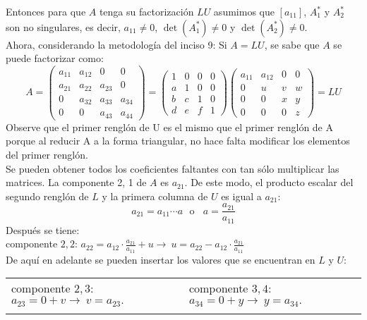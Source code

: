 \documentclass[11pt,letterpaper]{article}
\begin{document}
\begin{enumerate}
Entonces para que $A$ tenga su factorización $LU$ asumimos que $[a_{11}]$, $A_1^*$ y $A_2^*$ son no singulares, es decir, $a_{11} \neq 0$, $\det(A_1^*)\neq 0$ y $\det(A_2^*)\neq 0.$\\
Ahora, considerando la metodología del inciso 9: Si $A =LU$, se sabe que $A$ se puede factorizar como:
\begin{equation*}
A=\left(\begin{array}{cccc}
a_{11} & a_{12} &   0    &    0  \\
a_{21} & a_{22} & a_{23} &    0  \\
    0  & a_{32} & a_{33} & a_{34}\\
    0  &   0    & a_{43} & a_{44}
\end{array} \right)=
\left(\begin{array}{rrrr}
 1 &  0 &  0 & 0\\
 a &  1 &  0 & 0\\
 b &  c &  1 & 0\\
 d &  e &  f & 1
\end{array} \right) \left(\begin{array}{rrrr}
 a_{11} &  a_{12} & 0 & 0\\
 0 &  u &  v & w\\
 0 &  0 &  x & y\\
 0 &  0 &  0 & z
\end{array} \right)=LU
\end{equation*}
Observe que el primer renglón de U es el mismo que el primer renglón de A porque al reducir A a la forma triangular, no hace falta modificar los elementos del primer renglón.\\
Se pueden obtener todos los coeficientes faltantes con tan sólo multiplicar las matrices. La
componente 2, 1 de $A$ es $a_{21}$. De este modo, el producto escalar del segundo renglón de $L$ y la primera columna de $U$ es igual a $a_{21}$:
$$a_{21}=a_{11}\cdots a \ \ \ \text{o}  \ \ \ \ a=\frac{a_{21}}{a_{11}}$$
Después se tiene:\\
componente $2,2$: $a_{22}=a_{12}\cdot \frac{a_{21}}{a_{11}} +u \rightarrow \ u=a_{22}-a_{12}\cdot \left. \frac{a_{21}}{a_{11}}\right.$\\
De aquí en adelante se pueden insertar los valores que se encuentran en $L$ y $U$:
\begin{table}[H]
\centering
\begin{tabular}{l|l}
componente $2,3$: $a_{23}=0+v \rightarrow \ v=a_{23}.$ & componente $3,4$: $a_{34}=0+y \rightarrow \ y=a_{34}.$\\ \\

\end{tabular}
\end{table}
\end{enumerate}
\end{document}
